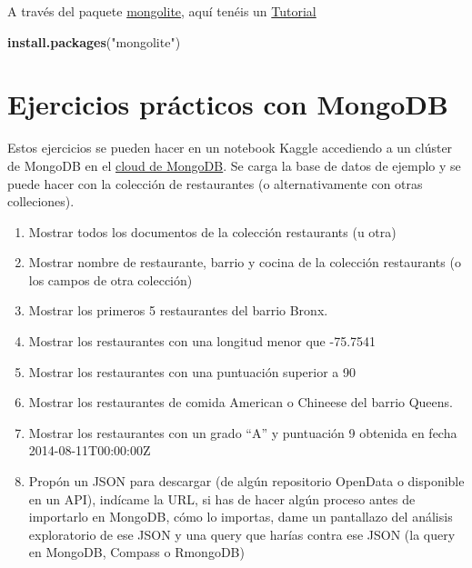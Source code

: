 \documentclass[
]{book}
\newenvironment{Shaded}{\begin{snugshade}}{\end{snugshade}}
\newcommand{\AttributeTok}[1]{\textcolor[rgb]{0.13,0.29,0.53}{#1}}
\newcommand{\CommentTok}[1]{\textcolor[rgb]{0.56,0.35,0.01}{\textit{#1}}}
\newcommand{\FunctionTok}[1]{\textcolor[rgb]{0.13,0.29,0.53}{\textbf{#1}}}
\newcommand{\NormalTok}[1]{#1}
\newcommand{\OtherTok}[1]{\textcolor[rgb]{0.56,0.35,0.01}{#1}}
\newcommand{\SpecialCharTok}[1]{\textcolor[rgb]{0.81,0.36,0.00}{\textbf{#1}}}
\newcommand{\StringTok}[1]{\textcolor[rgb]{0.31,0.60,0.02}{#1}}
\begin{document}
A través del paquete \href{https://cran.rstudio.com/web/packages/mongolite/mongolite.pdf}{mongolite}, aquí tenéis un \href{https://datascienceplus.com/using-mongodb-with-r/}{Tutorial}

\begin{Shaded}
\begin{Highlighting}[]
\FunctionTok{install.packages}\NormalTok{(}\StringTok{"mongolite"}\NormalTok{)}
\end{Highlighting}
\end{Shaded}

\begin{Shaded}
\end{Shaded}

\section{Ejercicios prácticos con MongoDB}\label{ejercicios-pruxe1cticos-con-mongodb}

Estos ejercicios se pueden hacer en un notebook Kaggle accediendo a un clúster de MongoDB en el \href{https://cloud.mongodb.com}{cloud de MongoDB}. Se carga la base de datos de ejemplo y se puede hacer con la colección de restaurantes (o alternativamente con otras colleciones).

\begin{enumerate}
\def\labelenumi{\arabic{enumi}.}
\item
  Mostrar todos los documentos de la colección restaurants (u otra)
\item
  Mostrar nombre de restaurante, barrio y cocina de la colección restaurants (o los campos de otra colección)
\item
  Mostrar los primeros 5 restaurantes del barrio Bronx.
\item
  Mostrar los restaurantes con una longitud menor que -75.7541
\item
  Mostrar los restaurantes con una puntuación superior a 90
\item
  Mostrar los restaurantes de comida American o Chineese del barrio Queens.
\item
  Mostrar los restaurantes con un grado ``A'' y puntuación 9 obtenida en fecha 2014-08-11T00:00:00Z
\item
  Propón un JSON para descargar (de algún repositorio OpenData o disponible en un API), indícame la URL, si has de hacer algún proceso antes de importarlo en MongoDB, cómo lo importas, dame un pantallazo del análisis exploratorio de ese JSON y una query que harías contra ese JSON (la query en MongoDB, Compass o RmongoDB)
\end{enumerate}
\end{document}
